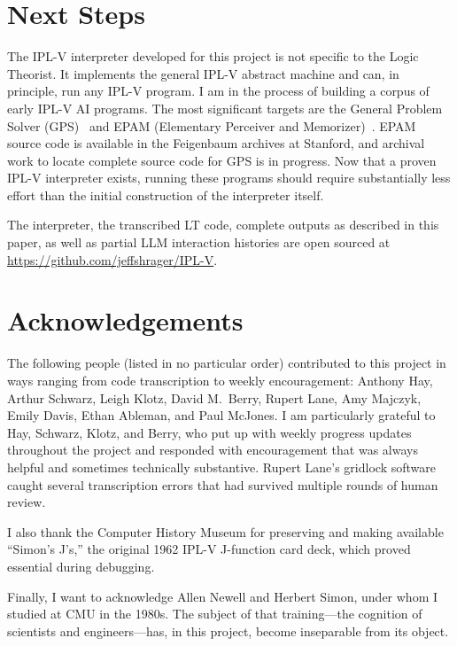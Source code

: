 \documentclass[journal]{IEEEtran}
\begin{document}
\section{Next Steps}
\label{sec:next}

The IPL-V interpreter developed for this project is not specific to
the Logic Theorist. It implements the general IPL-V abstract machine
and can, in principle, run any IPL-V program. I am in the process of
building a corpus of early IPL-V AI programs. The most significant
targets are the General Problem Solver (GPS)~\cite{newell1959gps} and
EPAM (Elementary Perceiver and
Memorizer)~\cite{feigenbaum1961epam}. EPAM source code is available in
the Feigenbaum archives at Stanford, and archival work to locate
complete source code for GPS is in progress. Now that a proven IPL-V
interpreter exists, running these programs should require
substantially less effort than the initial construction of the
interpreter itself.

The interpreter, the transcribed LT code, complete outputs as
described in this paper, as well as partial LLM interaction histories
are open sourced at \url{https://github.com/jeffshrager/IPL-V}.

\section*{Acknowledgements}

The following people (listed in no particular order) contributed to
this project in ways ranging from code transcription to weekly
encouragement: Anthony Hay, Arthur Schwarz, Leigh Klotz, David
M.\ Berry, Rupert Lane, Amy Majczyk, Emily Davis, Ethan Ableman, and
Paul McJones. I am particularly grateful to Hay, Schwarz, Klotz, and
Berry, who put up with weekly progress updates throughout the project
and responded with encouragement that was always helpful and sometimes
technically substantive. Rupert Lane's gridlock software caught
several transcription errors that had survived multiple rounds of
human review.

I also thank the Computer History Museum for preserving and making
available ``Simon's J's,'' the original 1962 IPL-V J-function card
deck, which proved essential during debugging.

Finally, I want to acknowledge Allen Newell and Herbert Simon, under
whom I studied at CMU in the 1980s. The subject of that
training---the cognition of scientists and engineers---has, in this
project, become inseparable from its object.
\end{document}
